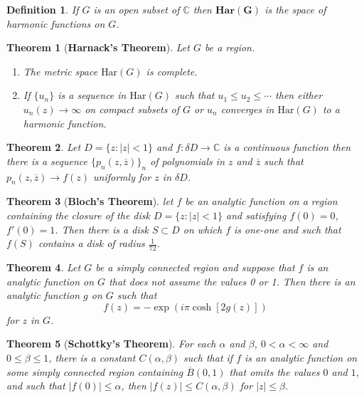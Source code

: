 \documentclass[answers, a4paper, 12pt]{exam}
\newtheorem{theorem}{Theorem}[section]
\newtheorem{definition}{Definition}
\newcommand{\C}{\mathbb{C}}
\begin{document}
\begin{definition}
    If $G$ is an open subset of $\C$ then $\bm{\textbf{Har}(G)}$ is the space of harmonic functions on $G$.
\end{definition}

\begin{theorem}[\textbf{Harnack's Theorem}]
    Let $G$ be a region.
    \begin{enumerate}
        \item The metric space $\text{Har}(G)$ is complete.
        \item If $\{u_n\}$ is a sequence in $\text{Har}(G)$ such that $u_1\leq u_2\leq\cdots$ then either $u_n(z)\to\infty$ on compact subsets of $G$ or ${u_n}$ converges in $\text{Har}(G)$ to a harmonic function.
    \end{enumerate}
\end{theorem}

\begin{theorem}
    Let $D=\{z: |z|<1\}$ and $f:\delta D\to\C$ is a continuous function then there is a sequence $\{p_n(z,\overline{z})\}_n$ of polynomials in $z$ and $\overline{z}$ such that $p_n(z,\overline{z})\to f(z)$ uniformly for $z$ in $\delta D$.
\end{theorem}

\begin{theorem}[\textbf{Bloch's Theorem}]
    let $f$ be an analytic function on a region containing the closure of the disk $D=\{z: |z|<1\}$ and satisfying $f(0)=0$, $f'(0)=1$. Then there is a disk $S\subset D$ on which $f$ is one-one and such that $f(S)$ contains a disk of radius $\frac{1}{72}$.
\end{theorem}

\begin{theorem}
    Let $G$ be a simply connected region and suppose that $f$ is an analytic function on $G$ that does not assume the values 0 or 1. Then there is an analytic function $g$ on $G$ such that
    $$f(z)=-\exp{(i\pi\cosh{[2g(z)]})}$$
    for $z$ in $G$.
\end{theorem}

\begin{theorem}[\textbf{Schottky's Theorem}]
    For each $\alpha$ and $\beta$, $0<\alpha<\infty$ and $0\leq\beta\leq 1$, there is a constant $C(\alpha, \beta)$ such that if $f$ is an analytic function on some simply connected region containing $\overline{B}(0,1)$ that omits the values $0$ and $1$, and such that $|f(0)|\leq\alpha$, then $|f(z)|\leq C(\alpha,\beta)$ for $|z|\leq\beta$.
\end{theorem}
\end{document}
